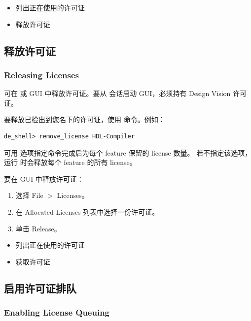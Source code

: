 \begin{seeAlsoBox}
\begin{itemize}
  \item 列出正在使用的许可证
  \item 释放许可证
\end{itemize}
\end{seeAlsoBox}

\subsection{释放许可证}
\subsubsection*{Releasing Licenses}

可在  或 GUI 中释放许可证。要从  会话启动 GUI，必须持有 Design Vision 许可证。

要释放已检出到您名下的许可证，使用  命令。例如：
\begin{lstlisting}
de_shell> remove_license HDL-Compiler
\end{lstlisting}
可用  选项指定命令完成后为每个 feature 保留的 license 数量。
若不指定该选项，运行  时会释放每个 feature 的所有 license。

要在 GUI 中释放许可证：
\begin{enumerate}
  \item 选择 File $>$ Licenses。
  \item 在 Allocated Licenses 列表中选择一份许可证。
  \item 单击 Release。
\end{enumerate}

\begin{seeAlsoBox}
\begin{itemize}
  \item 列出正在使用的许可证
  \item 获取许可证
\end{itemize}
\end{seeAlsoBox}

\subsection{启用许可证排队}
\subsubsection*{Enabling License Queuing}


